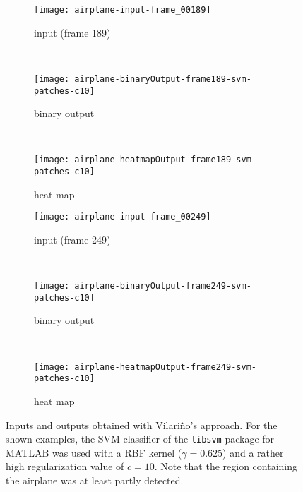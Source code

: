 \begin{figure}[ht]
	\centering
	\begin{subfigure}[h]{0.31\textwidth}
		\texttt{[image: airplane-input-frame\_00189]}	
		\caption*{input (frame 189)}
	\end{subfigure}
	~
	\begin{subfigure}[h]{0.31\textwidth}
		\texttt{[image: airplane-binaryOutput-frame189-svm-patches-c10]}	
		\caption*{binary output}
	\end{subfigure}
	~
	\begin{subfigure}[h]{0.31\textwidth}
		\texttt{[image: airplane-heatmapOutput-frame189-svm-patches-c10]}	
		\caption*{heat map}
	\end{subfigure}
	
	\vspace{3mm}
	\begin{subfigure}[h]{0.31\textwidth}
		\texttt{[image: airplane-input-frame\_00249]}	
		\caption*{input (frame 249)}
	\end{subfigure}
	~
	\begin{subfigure}[h]{0.31\textwidth}
		\texttt{[image: airplane-binaryOutput-frame249-svm-patches-c10]}	
		\caption*{binary output}
	\end{subfigure}	
	~
	\begin{subfigure}[h]{0.31\textwidth}
		\texttt{[image: airplane-heatmapOutput-frame249-svm-patches-c10]}	
		\caption*{heat map}
	\end{subfigure}	
	\caption{Inputs and outputs obtained with Vilari\~no's approach. For the shown examples, the SVM classifier of the {\tt libsvm} package for MATLAB \cite{libsvm} was used with a RBF kernel ($\gamma = 0.625$) and a rather high regularization value of $c = 10$. Note that the region containing the airplane was at least partly detected.}
	\label{fig:theirapproachairplane}
\end{figure}


